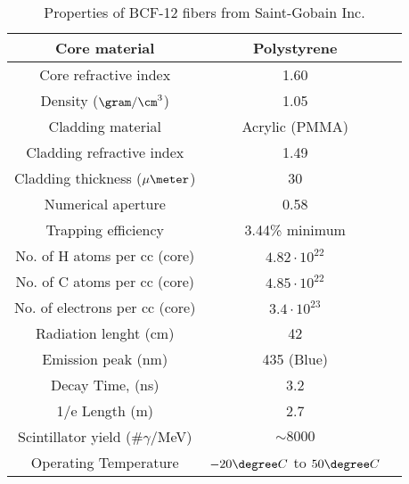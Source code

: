 \begin{table}[htbp]
\begin{center}
\begin{tabular}{|c|c|c|}
\hline \hline 
Core material & Polystyrene \\ \hline
Core refractive index & 1.60 \\ \hline
Density ($\gram/\cm^3$) & 1.05 \\ \hline
Cladding material & Acrylic (PMMA) \\ \hline
Cladding refractive index & 1.49 \\ \hline
Cladding thickness ($\mu\meter$) & 30 \\ \hline
Numerical aperture & 0.58 \\ \hline
Trapping efficiency & 3.44\% minimum \\ \hline
No. of H atoms per cc (core) & $4.82 \cdot{} 10^{22}$ \\ \hline
No. of C atoms per cc (core) & $4.85 \cdot{} 10^{22}$ \\ \hline
No. of electrons per cc (core) & $3.4 \cdot{} 10^{23}$ \\ \hline
Radiation lenght (cm) & 42 \\ \hline
Emission peak (nm) & 435 (Blue) \\ \hline
Decay Time, (ns) & 3.2 \\ \hline
1/e Length (m) & 2.7 \\ \hline
Scintillator yield (\#$\gamma$/MeV) & $\sim 8000$ \\ \hline
Operating Temperature & $-20\degree C$ to $50\degree C$ \\ \hline
\end{tabular}
\caption{Properties of BCF-12 fibers from Saint-Gobain Inc. \cite{DataSheetBCF12Fiber}}
\label{tab:ParametersFibersBCF12}
\end{center}
\end{table}


